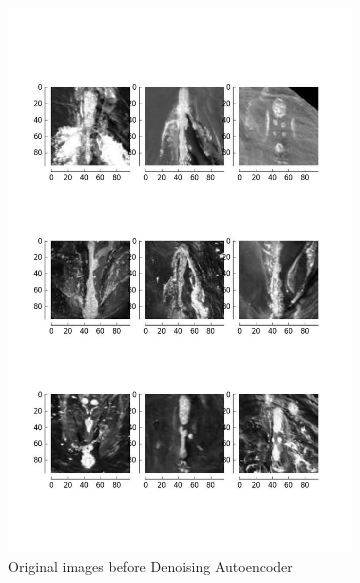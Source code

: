 \begin{figure}[H]
	\centering
	\begin{subfigure}[b]{0.45\linewidth}
		\includegraphics[width=\linewidth]{sections/imgs/preprocessing/denoising_autoencoder_1.png}
		\caption{Original images before Denoising Autoencoder}
		\label{fig:before_denoising_autoencoder}
	\end{subfigure}
	\begin{subfigure}[b]{0.45\linewidth}

\end{subfigure}
\end{figure}
